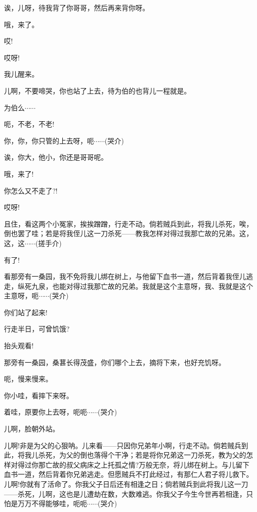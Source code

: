 {诶，儿呀，待我背了你哥哥，然后再来背你呀。

哦，来了。

哎!


哎呀!

我儿醒来。

儿啊，不要啼哭，你也站了上去，待为伯的也背儿一程就是。

为伯么$\cdots{}\cdots{}$

呃，不老，不老!

你，你，你只管的上去呀，呃$\cdots{}\cdots{}$({\hwfs 哭介})

诶，你大，他小，你还是哥哥呢。

哦，来了!


你怎么又不走了?!

哎呀!

且住，看这两个小冤家，挨挨蹭蹭，行走不动。倘若贼兵到此，将我儿杀死，唉，倒也罢了哇；若是将我侄儿这一刀杀死------教我怎样对得过我那亡故的兄弟。这，这，这$\cdots{}\cdots{}$(搓手{\hwfs 介})

有了!

看那旁有一桑园，我不免将我儿绑在树上，与他留下血书一道，然后背着我侄儿逃走，纵死九泉，也能对得过我那亡故的兄弟。我就是这个主意呀，我、我就是这个主意呀，呃$\cdots{}\cdots{}$({\hwfs 哭}{\hwfs 介})

你们站了起来!

行走半日，可曾饥饿?

抬头观看!

那旁有一桑园，桑葚长得茂盛，你们哪个上去，摘将下来，也好充饥呀。

呃，慢来慢来。

你小哇，看摔下来呀。

着哇，原要你上去呀，呃呃$\cdots{}\cdots{}$({\hwfs 哭介})

儿啊，脸朝外站。

儿啊!非是为父的心狠呐。儿来看------只因你兄弟年小啊，行走不动。倘若贼兵到此，将我儿杀死，为父的倒也落得个干净；若是将你兄弟这一刀杀死，教为父的怎样对得过你那亡故的叔父病床之上托孤之情?万般无奈，将儿绑在树上。与儿留下血书一道，然后背着你兄弟逃走。但愿贼兵不打此经过，有那仁人君子将儿救下。儿啊!你就有了活命了。你我父子日后还有相逢之日；倘若贼兵到此将我儿这一刀------杀死，儿啊，这也是儿遭劫在数，大数难逃。你我父子今生今世再若相逢，只怕是万万不得能够哇，呃呃$\cdots{}\cdots{}$({\hwfs 哭介})

}
